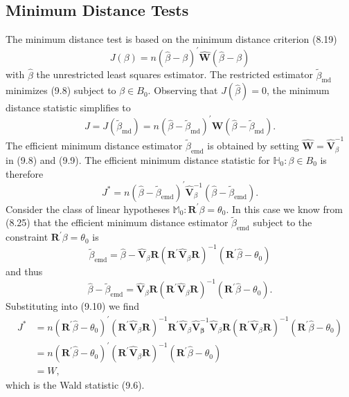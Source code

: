 \documentclass[10pt]{article}
\begin{document}
\subsection{Minimum Distance Tests}
The minimum distance test is based on the minimum distance criterion (8.19)
$$
J(\beta)=n(\widehat{\beta}-\beta)^{\prime} \widehat{\boldsymbol{W}}(\widehat{\beta}-\beta)
$$
with $\widehat{\beta}$ the unrestricted least squares estimator. The restricted estimator $\widetilde{\beta}_{\text {md }}$ minimizes (9.8) subject to $\beta \in B_{0}$. Observing that $J(\widehat{\beta})=0$, the minimum distance statistic simplifies to
$$
J=J\left(\widetilde{\beta}_{\mathrm{md}}\right)=n\left(\widehat{\beta}-\widetilde{\beta}_{\mathrm{md}}\right)^{\prime} \widehat{\boldsymbol{W}}\left(\widehat{\beta}-\widetilde{\beta}_{\mathrm{md}}\right) .
$$
The efficient minimum distance estimator $\widetilde{\beta}_{\mathrm{emd}}$ is obtained by setting $\widehat{\boldsymbol{W}}=\widehat{\boldsymbol{V}}_{\beta}^{-1}$ in (9.8) and (9.9). The efficient minimum distance statistic for $\mathbb{H}_{0}: \beta \in B_{0}$ is therefore
$$
J^{*}=n\left(\widehat{\beta}-\widetilde{\beta}_{\mathrm{emd}}\right)^{\prime} \widehat{\boldsymbol{V}}_{\beta}^{-1}\left(\widehat{\beta}-\widetilde{\beta}_{\mathrm{emd}}\right) .
$$
Consider the class of linear hypotheses $\mathbb{M}_{0}: \boldsymbol{R}^{\prime} \beta=\theta_{0}$. In this case we know from (8.25) that the efficient minimum distance estimator $\widetilde{\beta}_{\mathrm{emd}}$ subject to the constraint $\boldsymbol{R}^{\prime} \beta=\theta_{0}$ is
$$
\widetilde{\beta}_{\mathrm{emd}}=\widehat{\beta}-\widehat{\boldsymbol{V}}_{\beta} \boldsymbol{R}\left(\boldsymbol{R}^{\prime} \widehat{\boldsymbol{V}}_{\beta} \boldsymbol{R}\right)^{-1}\left(\boldsymbol{R}^{\prime} \widehat{\beta}-\theta_{0}\right)
$$
and thus
$$
\widehat{\beta}-\widetilde{\beta}_{\mathrm{emd}}=\widehat{\boldsymbol{V}}_{\beta} \boldsymbol{R}\left(\boldsymbol{R}^{\prime} \widehat{\boldsymbol{V}}_{\beta} \boldsymbol{R}\right)^{-1}\left(\boldsymbol{R}^{\prime} \widehat{\beta}-\theta_{0}\right) .
$$
Substituting into (9.10) we find
$$
\begin{aligned}
J^{*} &=n\left(\boldsymbol{R}^{\prime} \widehat{\beta}-\theta_{0}\right)^{\prime}\left(\boldsymbol{R}^{\prime} \widehat{\boldsymbol{V}}_{\beta} \boldsymbol{R}\right)^{-1} \boldsymbol{R}^{\prime} \widehat{\boldsymbol{V}}_{\beta} \widehat{\boldsymbol{V}}_{\boldsymbol{\beta}}^{-1} \widehat{\boldsymbol{V}}_{\beta} \boldsymbol{R}\left(\boldsymbol{R}^{\prime} \widehat{\boldsymbol{V}}_{\beta} \boldsymbol{R}\right)^{-1}\left(\boldsymbol{R}^{\prime} \widehat{\beta}-\theta_{0}\right) \\
&=n\left(\boldsymbol{R}^{\prime} \widehat{\beta}-\theta_{0}\right)^{\prime}\left(\boldsymbol{R}^{\prime} \widehat{\boldsymbol{V}}_{\beta} \boldsymbol{R}\right)^{-1}\left(\boldsymbol{R}^{\prime} \widehat{\beta}-\theta_{0}\right) \\
&=W,
\end{aligned}
$$
which is the Wald statistic (9.6).
\end{document}
